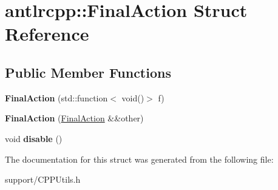 \hypertarget{structantlrcpp_1_1FinalAction}{}\section{antlrcpp\+:\+:Final\+Action Struct Reference}
\label{structantlrcpp_1_1FinalAction}
\subsection*{Public Member Functions}
\begin{DoxyCompactItemize}
\item 
\mbox{\label{structantlrcpp_1_1FinalAction_a7b31f184f1c524ae5dedd5fb9164a0a3}} 
{\bfseries Final\+Action} (std\+::function$<$ void()$>$ f)
\item 
\mbox{\label{structantlrcpp_1_1FinalAction_a8eb71a4db1c6703b5ae169aca77a891f}} 
{\bfseries Final\+Action} (\hyperlink{structantlrcpp_1_1FinalAction}{Final\+Action} \&\&other)
\item 
\mbox{\label{structantlrcpp_1_1FinalAction_a1f71326314d9f84a7b36d522e58b3f1e}} 
void {\bfseries disable} ()
\end{DoxyCompactItemize}


The documentation for this struct was generated from the following file\+:\begin{DoxyCompactItemize}
\item 
support/C\+P\+P\+Utils.\+h\end{DoxyCompactItemize}
